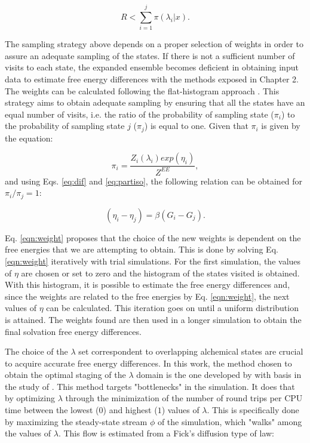 	\begin{equation}
	R < \sum_{i=1}^{j} \pi(\lambda_{i}|x) .
	\label{eqn:relee2}
	\end{equation} 
	
	The sampling strategy above depends on a proper selection of weights in order to assure an adequate sampling of the states. If there is not a sufficient number of visits to each state, the expanded ensemble becomes deficient in obtaining input data to estimate free energy differences with the methods exposed in Chapter 2. The weights can be calculated following the flat-histogram approach \cite{bernd1992,bernd1993,dayal2004}. This strategy aims to obtain adequate sampling by ensuring that all the states have an equal number of visits, i.e. the ratio of the probability of sampling state ($\pi_{i}$) to the probability of sampling state $j$ ($\pi_{j}$) is equal to one. Given that $\pi_{i}$ is given by the equation:
	
	\begin{equation}
	\pi_{i} = \dfrac{Z_{i}(\lambda_{i}) exp(\eta_{i})}{Z^{EE}} ,
	\label{eqn:wei1}
	\end{equation} 
	and using Eqs. \ref{eq:dif} and \ref {eq:partiso}, the following relation can be obtained for $\pi_{i}/\pi_{j}=1$:
	
	\begin{equation}
	(\eta_{i} - \eta_{j}) = \beta(G_i-G_j).
	\label{eqn:weight}
	\end{equation}
	
	Eq. \eqref{eqn:weight} proposes that the choice of the new weights is dependent on the free energies that we are attempting to obtain. This is done by solving Eq. \eqref{eqn:weight} iteratively with trial simulations. For the first simulation, the values of $\eta$ are chosen or set to zero and the histogram of the states visited is obtained. With this histogram, it is possible to estimate the free energy differences and, since the weights are related to the free energies by Eq. \eqref{eqn:weight}, the next values of $\eta$ can be calculated. This iteration goes on until a uniform distribution is attained. The weights found are then used in a longer simulation to obtain the final solvation free energy differences.
	
	The choice of the $\lambda$ set correspondent to overlapping alchemical states are crucial to acquire accurate free energy differences. In this work, the method chosen to obtain the optimal staging of the $\lambda$ domain is the one developed by  with basis in the study of  . This method targets "bottlenecks" in the simulation. It does that by optimizing $\lambda$ through the minimization of the number of round trips per CPU time between the lowest ($0$) and highest ($1$) values of $\lambda$. This is specifically done by maximizing the steady-state stream $\phi$ of the simulation, which "walks" among the values of $\lambda$. This flow is estimated from a Fick's diffusion type of law:
	
